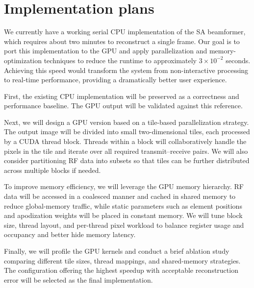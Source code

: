 \documentclass{article}
\begin{document}
\section{Implementation plans}

We currently have a working serial CPU implementation of the SA beamformer, which requires about two minutes to reconstruct a single frame. Our goal is to port this implementation to the GPU and apply parallelization and memory-optimization techniques to reduce the runtime to approximately $3\times 10^{-2}$ seconds. Achieving this speed would transform the system from non-interactive processing to real-time performance, providing a dramatically better user experience.

First, the existing CPU implementation will be preserved as a correctness and performance baseline. The GPU output will be validated against this reference.

Next, we will design a GPU version based on a tile-based parallelization strategy. The output image will be divided into small two-dimensional tiles, each processed by a CUDA thread block. Threads within a block will collaboratively handle the pixels in the tile and iterate over all required transmit--receive pairs. We will also consider partitioning RF data into subsets so that tiles can be further distributed across multiple blocks if needed.

To improve memory efficiency, we will leverage the GPU memory hierarchy. RF data will be accessed in a coalesced manner and cached in shared memory to reduce global-memory traffic, while static parameters such as element positions and apodization weights will be placed in constant memory. We will tune block size, thread layout, and per-thread pixel workload to balance register usage and occupancy and better hide memory latency.

Finally, we will profile the GPU kernels and conduct a brief ablation study comparing different tile sizes, thread mappings, and shared-memory strategies. The configuration offering the highest speedup with acceptable reconstruction error will be selected as the final implementation.


  

  
\end{document}
